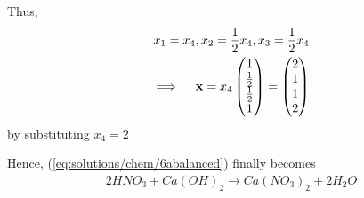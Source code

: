 Thus,
\begin{align}
    x_1=x_4, x_2= \frac{1}{2}x_4, x_3=\frac{1}{2}x_4\\
    \implies \quad\mathbf{x}= x_4\begin{pmatrix} 1\\ \frac{1}{2}\\ \frac{1}{2}\\1\end{pmatrix} =\begin{pmatrix} 2\\1\\1\\2\end{pmatrix}
\end{align} 
by substituting $x_4= 2$ 

\hfill\break
Hence, (\ref{eq:solutions/chem/6abalanced}) finally becomes
\begin{align}
    2HNO_{3}+ Ca(OH)_{2}\to Ca(NO_{3})_{2}+ 2H_{2}O
\end{align}
